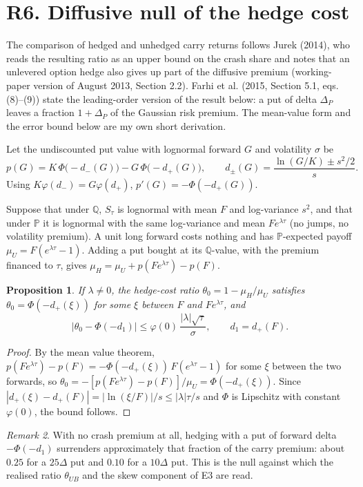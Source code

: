 \documentclass[11pt]{article}
\newtheorem{proposition}{Proposition}
\theoremstyle{remark}
\newtheorem{remark}[proposition]{Remark}
\newcommand{\Q}{\mathbb{Q}}
\renewcommand{\P}{\mathbb{P}}
\begin{document}
\section*{R6. Diffusive null of the hedge cost}

The comparison of hedged and unhedged carry returns follows Jurek (2014), who reads the resulting ratio as an upper bound on the crash share and notes that an unlevered option hedge also gives up part of the diffusive premium (working-paper version of August 2013, Section 2.2). Farhi et al. (2015, Section 5.1, eqs. (8)--(9)) state the leading-order version of the result below: a put of delta $\Delta_P$ leaves a fraction $1+\Delta_P$ of the Gaussian risk premium. The mean-value form and the error bound below are my own short derivation.

Let the undiscounted put value with lognormal forward $G$ and volatility $\sigma$ be
\[
p(G)=K\,\Phi\bigl(-d_-(G)\bigr)-G\,\Phi\bigl(-d_+(G)\bigr),\qquad d_\pm(G)=\frac{\ln(G/K)\pm s^2/2}{s}.
\]
Using $K\varphi(d_-)=G\varphi(d_+)$, $p'(G)=-\Phi(-d_+(G))$.

Suppose that under $\Q$, $S_\tau$ is lognormal with mean $F$ and log-variance $s^2$, and that under $\P$ it is lognormal with the same log-variance and mean $Fe^{\lambda\tau}$ (no jumps, no volatility premium). A unit long forward costs nothing and has $\P$-expected payoff $\mu_U=F(e^{\lambda\tau}-1)$. Adding a put bought at its $\Q$-value, with the premium financed to $\tau$, gives $\mu_H=\mu_U+p(Fe^{\lambda\tau})-p(F)$.

\begin{proposition}
If $\lambda\ne0$, the hedge-cost ratio $\theta_0=1-\mu_H/\mu_U$ satisfies $\theta_0=\Phi(-d_+(\xi))$ for some $\xi$ between $F$ and $Fe^{\lambda\tau}$, and
\[
\bigl|\theta_0-\Phi(-d_1)\bigr|\le\varphi(0)\,\frac{|\lambda|\sqrt{\tau}}{\sigma},\qquad d_1=d_+(F).
\]
\end{proposition}

\begin{proof}
By the mean value theorem, $p(Fe^{\lambda\tau})-p(F)=-\Phi(-d_+(\xi))\,F(e^{\lambda\tau}-1)$ for some $\xi$ between the two forwards, so $\theta_0=-[p(Fe^{\lambda\tau})-p(F)]/\mu_U=\Phi(-d_+(\xi))$. Since $|d_+(\xi)-d_+(F)|=|\ln(\xi/F)|/s\le|\lambda|\tau/s$ and $\Phi$ is Lipschitz with constant $\varphi(0)$, the bound follows.
\end{proof}

\begin{remark}
With no crash premium at all, hedging with a put of forward delta $-\Phi(-d_1)$ surrenders approximately that fraction of the carry premium: about $0.25$ for a $25\Delta$ put and $0.10$ for a $10\Delta$ put. This is the null against which the realised ratio $\theta_{UB}$ and the skew component of E3 are read.
\end{remark}
\end{document}
